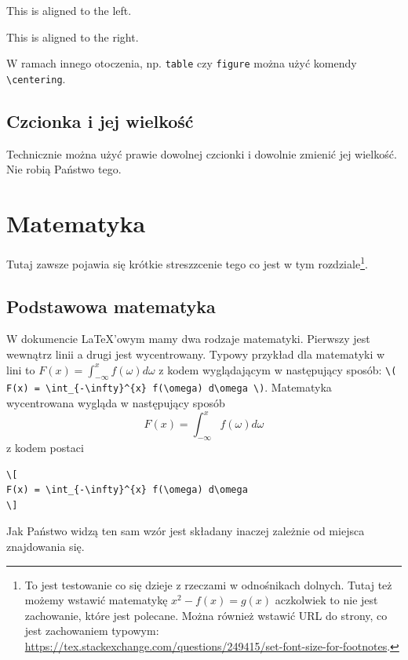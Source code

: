 \documentclass[polish, twoside, 12pt, a4paper]{article}
\theoremstyle{definition}
\theoremstyle{plain}
\theoremstyle{remark}
\begin{document}
\begin{flushleft}
  This is aligned to the left.
\end{flushleft}

\begin{flushright}
  This is aligned to the right.
\end{flushright}

W ramach innego otoczenia, np. \verb+table+ czy \verb+figure+ można użyć komendy \verb+\centering+.

\subsection{Czcionka i jej wielkość}

Technicznie można użyć prawie dowolnej czcionki i dowolnie zmienić jej wielkość. Nie robią Państwo tego.

\clearpage
\section{Matematyka}

Tutaj zawsze pojawia się krótkie streszzcenie tego co jest w tym rozdziale\footnote{To jest testowanie co się dzieje z rzeczami w odnośnikach dolnych. Tutaj też możemy wstawić matematykę \( x^2 - f(x) = g(x) \) aczkolwiek to nie jest zachowanie, które jest polecane. Można również wstawić URL do strony, co jest zachowaniem typowym: \url{https://tex.stackexchange.com/questions/249415/set-font-size-for-footnotes}.}.

\subsection{Podstawowa matematyka}

W dokumencie \LaTeX'owym mamy dwa rodzaje matematyki. Pierwszy jest wewnątrz linii a drugi jest wycentrowany. Typowy przykład dla matematyki w lini to  \( F(x) = \int_{-\infty}^{x} f(\omega) d\omega \) z kodem wyglądającym w następujący sposób: \verb!\( F(x) = \int_{-\infty}^{x} f(\omega) d\omega \)!. Matematyka wycentrowana wygląda w następujący sposób
\[
F(x) = \int_{-\infty}^{x} f(\omega) d\omega
\]
z kodem postaci
\begin{verbatim}
\[
F(x) = \int_{-\infty}^{x} f(\omega) d\omega
\]
\end{verbatim}
Jak Państwo widzą ten sam wzór jest składany inaczej zależnie od miejsca znajdowania się.
\end{document}
